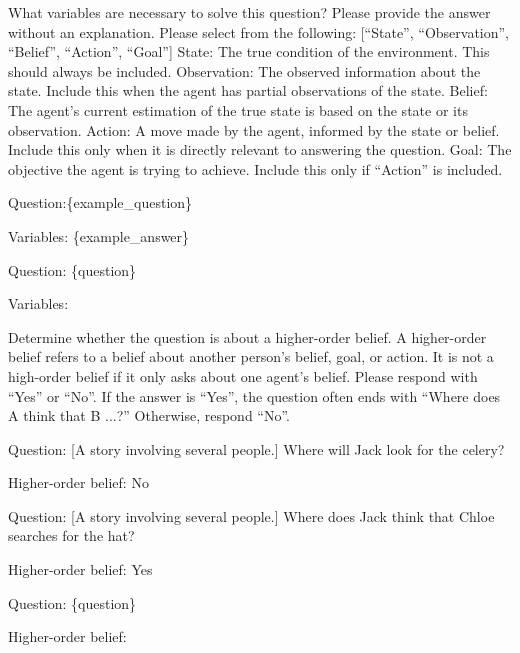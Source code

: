 \begin{tcolorbox}[
    breakable,
    colframe=purple!40!black,
    colback=purple!10,
    coltitle=white,
    fonttitle=\bfseries,
    title=Proposing the initial model,
    colbacktitle=purple!40!black
]
What variables are necessary to solve this question? Please provide the answer without an explanation. \newline
Please select from the following: [``State'', ``Observation'', ``Belief'', ``Action'', ``Goal''] \newline
State: The true condition of the environment. This should always be included. \newline
Observation: The observed information about the state. Include this when the agent has partial observations of the state. \newline
Belief: The agent's current estimation of the true state is based on the state or its observation. \newline
Action: A move made by the agent, informed by the state or belief. Include this only when it is directly relevant to answering the question. \newline
Goal: The objective the agent is trying to achieve. Include this only if ``Action'' is included. \newline

Question:\{example\_question\}

Variables: \{example\_answer\}

Question: \{question\}

Variables:
\end{tcolorbox}



\begin{tcolorbox}[
    breakable,
    colframe=purple!40!black,
    colback=purple!10,
    coltitle=white,
    fonttitle=\bfseries,
    title=Determining if the question contains a higher-order belief,
    colbacktitle=purple!40!black
]
Determine whether the question is about a higher-order belief. \newline
A higher-order belief refers to a belief about another person's belief, goal, or action. \newline
It is not a high-order belief if it only asks about one agent's belief. \newline
Please respond with ``Yes'' or ``No''. \newline
If the answer is ``Yes'', the question often ends with ``Where does A think that B ...?'' Otherwise, respond ``No''. \newline

Question: [A story involving several people.] Where will Jack look for the celery?

Higher-order belief: No

Question: [A story involving several people.] Where does Jack think that Chloe searches for the hat?

Higher-order belief: Yes 

Question: \{question\}

Higher-order belief:
\end{tcolorbox}